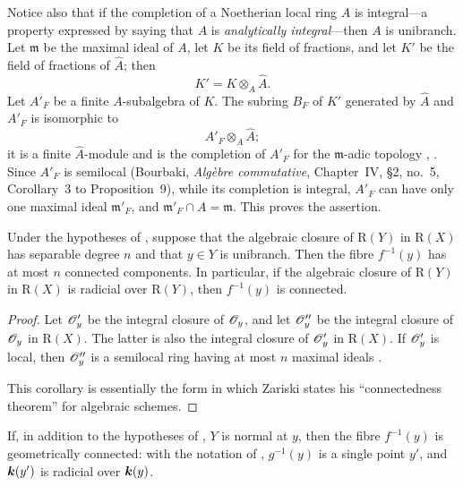 Notice also that if the completion of a Noetherian local ring $A$ is
integral---a property expressed by saying that $A$ is
\emph{analytically integral}---then $A$ is unibranch.  Let
$\mathfrak{m}$ be the maximal ideal of $A$, let $K$ be its field of
fractions, and let $K'$ be the field of fractions of $\widehat{A}$;
then
\[
  K'=K\otimes_A\widehat{A}.
\]
Let $A'_F$ be a finite $A$-subalgebra of $K$.  The subring $B_F$ of
$K'$ generated by $\widehat{A}$ and $A'_F$ is isomorphic to
\[
  A'_F\otimes_A\widehat{A};
\]
it is a finite $\widehat{A}$-module and is the completion of $A'_F$
for the $\mathfrak{m}$-adic topology
, .  Since $A'_F$ is semilocal
(Bourbaki, \emph{Alg\`ebre commutative}, Chapter~IV, \S2, no.~5,
Corollary~3 to Proposition~9), while its completion is integral,
$A'_F$ can have only one maximal ideal $\mathfrak{m}'_F$, and
$\mathfrak{m}'_F\cap A=\mathfrak{m}$.  This proves the assertion.

\begin{corollary}[4.3.7]
\label{III.4.3.7}
Under the hypotheses of , suppose that the algebraic
closure of $\mathrm{R}(Y)$ in $\mathrm{R}(X)$ has separable degree $n$ and that
$y\in Y$ is unibranch.  Then the fibre $f^{-1}(y)$ has at most $n$
connected components.  In particular, if the algebraic closure of
$\mathrm{R}(Y)$ in $\mathrm{R}(X)$ is radicial over $\mathrm{R}(Y)$, then $f^{-1}(y)$ is
connected.
\end{corollary}

\begin{proof}
Let $\mathscr{O}'_y$ be the integral closure of $\mathscr{O}_y$, and let
$\mathscr{O}''_y$ be the integral closure of $\mathscr{O}_y$ in $\mathrm{R}(X)$.
The latter is also the integral closure of $\mathscr{O}'_y$ in $\mathrm{R}(X)$.
If $\mathscr{O}'_y$ is local, then $\mathscr{O}''_y$ is a semilocal ring
having at most $n$ maximal ideals
\cite[vol.~I, p.~289, Theorem~22]{I-13}.

This corollary is essentially the form in which Zariski states his
``connectedness theorem'' for algebraic schemes.
\end{proof}

\begin{remark}[4.3.8]
\label{III.4.3.8}
If, in addition to the hypotheses of , $Y$ is
normal at $y$, then the fibre $f^{-1}(y)$ is geometrically
connected: with the notation of , $g^{-1}(y)$ is a
single point $y'$, and $\boldsymbol{k}(y')$ is radicial over $\boldsymbol{k}(y)$.
\end{remark}

